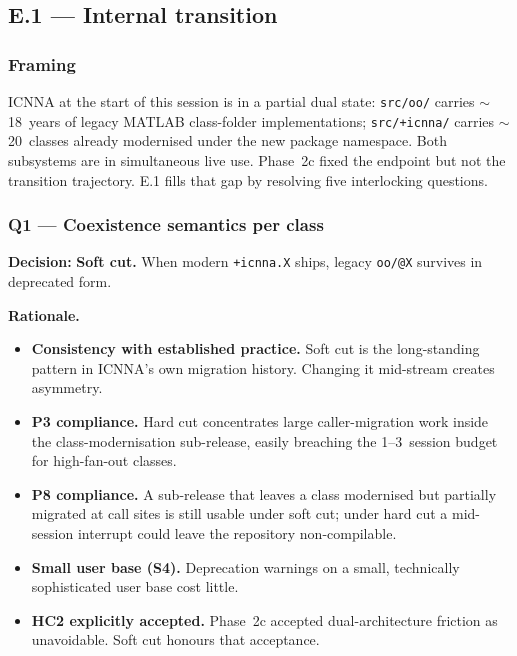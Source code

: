 \documentclass[11pt,a4paper]{article}
\begin{document}
\subsection{E.1 --- Internal transition}

\subsubsection{Framing}

ICNNA at the start of this session is in a partial dual state: \texttt{src/oo/} carries $\sim$18~years of legacy MATLAB class-folder implementations; \texttt{src/+icnna/} carries $\sim$20~classes already modernised under the new package namespace. Both subsystems are in simultaneous live use. Phase~2c fixed the endpoint but not the transition trajectory. E.1 fills that gap by resolving five interlocking questions.

\subsubsection{Q1 --- Coexistence semantics per class}

\textbf{Decision:} \textbf{Soft cut.} When modern \texttt{+icnna.X} ships, legacy \texttt{oo/@X} survives in deprecated form.

\textbf{Rationale.}
\begin{itemize}
    \item \textbf{Consistency with established practice.} Soft cut is the long-standing pattern in ICNNA's own migration history. Changing it mid-stream creates asymmetry.
    \item \textbf{P3 compliance.} Hard cut concentrates large caller-migration work inside the class-modernisation sub-release, easily breaching the 1--3~session budget for high-fan-out classes.
    \item \textbf{P8 compliance.} A sub-release that leaves a class modernised but partially migrated at call sites is still usable under soft cut; under hard cut a mid-session interrupt could leave the repository non-compilable.
    \item \textbf{Small user base (S4).} Deprecation warnings on a small, technically sophisticated user base cost little.
    \item \textbf{HC2 explicitly accepted.} Phase~2c accepted dual-architecture friction as unavoidable. Soft cut honours that acceptance.
\end{itemize}
\end{document}
